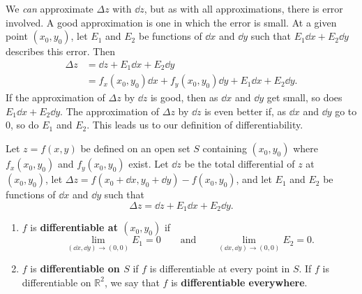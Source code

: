 We \emph{can} approximate $\Delta z$ with $\dd z$, but as with all approximations, there is error involved. A good approximation is one in which the error is small. At a given point $(x_0,y_0)$, let $E_1$ and $E_2$ be functions of $\dd x$ and $\dd y$ such that $E_1\dd x+E_2\dd y$ describes this error. Then
\begin{align*}
\Delta z &= \dd z + E_1\dd x+ E_2\dd y \\
		&= f_x(x_0,y_0)\dd x+f_y(x_0,y_0)\dd y + E_1\dd x+E_2\dd y.
\end{align*}
If the approximation of $\Delta z$ by $\dd z$ is good, then as $\dd x$ and $\dd y$ get small,  so does $E_1\dd x+E_2\dd y$. The approximation of $\Delta z$ by $\dd z$ is even better if, as $\dd x$ and $\dd y$ go to 0, so do $E_1$ and $E_2$. This leads us to our definition of differentiability.

\begin{definition}\label{def:multi_differentiability}%
Let $z=f(x,y)$ be defined on an open set $S$ containing $(x_0,y_0)$ where $f_x(x_0,y_0)$ and $f_y(x_0,y_0)$ exist. Let $\dd z$ be the total differential of $z$ at $(x_0,y_0)$, let $\Delta z = f(x_0+\dd x,y_0+\dd y) - f(x_0,y_0)$, and let $E_1$ and $E_2$ be functions of $\dd x$ and $\dd y$ such that 
\[\Delta z = \dd z + E_1\dd x + E_2\dd y.\]
\begin{enumerate}
	\item $f$ is \textbf{differentiable at $(x_0,y_0)$} if%
	\[\lim_{(\dd x,\dd y)\to(0,0)}E_1=0\qquad\text{and}\qquad\lim_{(\dd x,\dd y)\to(0,0)}E_2=0.\]
	\item $f$ is \textbf{differentiable on $S$} if $f$ is differentiable at every point in $S$. If $f$ is differentiable on $\mathbb{R}^2$, we say that $f$ is \textbf{differentiable everywhere}.
\end{enumerate}
\end{definition}

